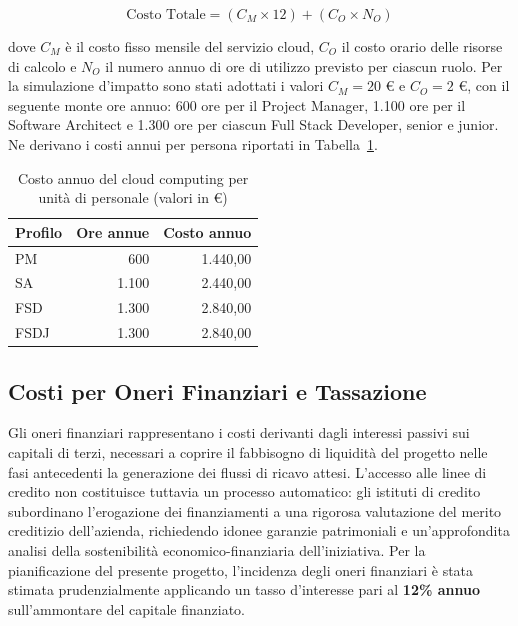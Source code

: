 \begin{equation}
    \text{Costo Totale} = (C_M \times 12) + (C_O \times N_O)
\end{equation}

dove $C_M$ \`e il costo fisso mensile del servizio cloud, $C_O$ il costo orario delle risorse di calcolo e $N_O$ il numero annuo di ore di utilizzo previsto per ciascun ruolo. Per la simulazione d'impatto sono stati adottati i valori $C_M = 20$ \euro{} e $C_O = 2$ \euro{}, con il seguente monte ore annuo: 600 ore per il Project Manager, 1.100 ore per il Software Architect e 1.300 ore per ciascun Full Stack Developer, senior e junior. Ne derivano i costi annui per persona riportati in Tabella~\ref{tab:cloud}.

\begin{table}[H]
\centering
\begin{tabular}{lrr}
\hline
\textbf{Profilo} & \textbf{Ore annue} & \textbf{Costo annuo} \\
\hline
PM   &   600 & 1.440,00 \\
SA   & 1.100 & 2.440,00 \\
FSD  & 1.300 & 2.840,00 \\
FSDJ & 1.300 & 2.840,00 \\
\hline
\end{tabular}
\caption{Costo annuo del cloud computing per unit\`a di personale (valori in \euro)}
\label{tab:cloud}
\end{table}

\subsection{Costi per Oneri Finanziari e Tassazione}

Gli oneri finanziari rappresentano i costi derivanti dagli interessi passivi sui capitali di terzi, necessari a coprire il fabbisogno di liquidit\`a del progetto nelle fasi antecedenti la generazione dei flussi di ricavo attesi. L'accesso alle linee di credito non costituisce tuttavia un processo automatico: gli istituti di credito subordinano l'erogazione dei finanziamenti a una rigorosa valutazione del merito creditizio dell'azienda, richiedendo idonee garanzie patrimoniali e un'approfondita analisi della sostenibilit\`a economico-finanziaria dell'iniziativa. Per la pianificazione del presente progetto, l'incidenza degli oneri finanziari \`e stata stimata prudenzialmente applicando un tasso d'interesse pari al \textbf{12\% annuo} sull'ammontare del capitale finanziato.

